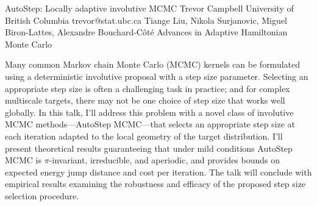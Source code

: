 \begin{talk}
  {AutoStep: Locally adaptive involutive MCMC}%
  {Trevor Campbell}%
  {University of British Columbia}%
  {trevor@stat.ubc.ca}%
  {Tiange Liu, Nikola Surjanovic, Miguel Biron-Lattes, Alexandre Bouchard-C\^ot\'e}%
  {Advances in Adaptive Hamiltonian Monte Carlo}%
    

\medskip

Many common Markov chain Monte Carlo (MCMC) kernels can be formulated using a deterministic involutive proposal with a step size parameter.  Selecting an appropriate step size is often a challenging task in practice; and for complex multiscale targets, there may not be one choice of step size that works well globally.  In this talk, I'll address this problem with a novel class of involutive MCMC methods---AutoStep MCMC---that selects an appropriate step size at each iteration adapted to the local geometry of the target distribution.  I'll present theoretical results guaranteeing that under mild conditions AutoStep MCMC is $\pi$-invariant, irreducible, and aperiodic, and provides bounds on expected energy jump distance and cost per iteration. The talk will conclude with empirical results examining the robustness and efficacy of the proposed step size selection procedure.

\end{talk}
